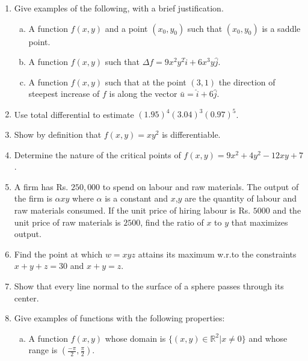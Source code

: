\documentclass[journal,12pt,twocolumn]{IEEEtran}
\begin{document}
\begin{enumerate}
\item Give examples of the following, with a brief justification. 

\begin{enumerate}[(a)]
 
\item A function $f(x,y)$ and a point $(x_0,y_0)$ such that $(x_0,y_0)$ is a saddle point.
\item A function $f(x,y)$ such that $\Delta f = 9x^2y^2 \hat{i}+6 x^3y \hat{j}.$
\item A function $f(x,y)$ such that at the point $(3,1)$ the direction of steepest increase of $f$ is along the vector $\bar{u}=\hat{i}+6\hat{j}$.

\end{enumerate}

 
\item Use total differential to estimate $(1.95)^4 (3.04)^3 (0.97)^5$.


\item Show by definition that $f(x,y) = xy^2$ is differentiable. 

\item Determine the nature of the critical points of $ f(x,y) = 9x^2+4y^2-12xy+7 $.

\item A firm has Rs. $250,000$ to spend on labour and raw materials. The output of the firm is $\alpha xy$
where $\alpha$ is a constant and $x$,$y$ are the quantity of labour and raw materials consumed. If the unit price of hiring labour is Rs. $5000$ and the unit price of raw materials is $2500$, find the ratio of $x$ to $y$ that maximizes output.

\item Find the point at which $w = xyz$ attains its maximum w.r.to the constraints $x + y + z = 30$ and
$x + y = z$.

\item Show that every line normal to the surface of a sphere passes through its center.

\item Give examples of functions with the following properties: 

\begin{enumerate}[(a)]
 
\item A function $f(x,y)$ whose domain is $\lbrace (x, y) \in \mathbb{R}^2 | x \neq 0 \rbrace$ and whose range is $(\frac{-\pi}{2},\frac{\pi}{2})$.



\end{enumerate}
\end{enumerate}
\end{document}
